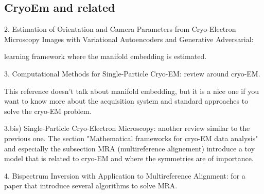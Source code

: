 \subsection{CryoEm and related}
2. Estimation of Orientation and Camera Parameters from Cryo-Electron Microscopy Images with Variational Autoencoders and Generative Adversarial: 

learning framework where the manifold embedding is estimated.

3. Computational Methods for Single-Particle Cryo-EM: 
review around cryo-EM. 

This reference doesn't talk about manifold embedding, but it is a nice one if you want to know more about 
the acquisition system and standard approaches to solve the cryo-EM problem.


3.bis) Single-Particle Cryo-Electron Microscopy: 
another review similar to the previous one. The section "Mathematical frameworks for cryo-EM data analysis" 
and especially the subsection MRA (multireference alignement) introduce 
a toy model that is related to cryo-EM and where the symmetries are of importance. 

4. Bispectrum Inversion with Application to Multireference Alignment: 
for a paper that introduce several algorithms to solve MRA.